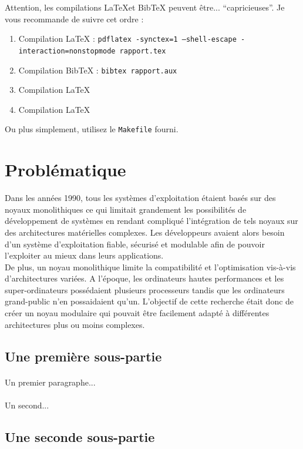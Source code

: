 \documentclass[a4paper, 12pt]{article}
\begin{document}
Attention, les compilations \LaTeX et BibTeX peuvent être... ``capricieuses''. Je vous recommande de suivre cet ordre :
\begin{enumerate}
\item Compilation \LaTeX{} : \texttt{pdflatex -synctex=1 --shell-escape -interaction=nonstopmode rapport.tex}
\item Compilation BibTeX : \texttt{bibtex rapport.aux}
\item Compilation \LaTeX{}
\item Compilation \LaTeX{}
\end{enumerate}
Ou plus simplement, utilisez le \texttt{Makefile} fourni.

\clearpage 
\section{Problématique}

Dans les années 1990, tous les systèmes d'exploitation étaient basés sur des noyaux monolithiques ce qui limitait grandement les possibilités de développement de systèmes en rendant compliqué l'intégration de tels noyaux sur des architectures matérielles complexes. Les développeurs avaient alors besoin d'un système d'exploitation fiable, sécurisé et modulable afin de pouvoir l'exploiter au mieux dans leurs applications. \\
De plus, un noyau monolithique limite la compatibilité et l'optimisation vis-à-vis d'architectures variées. A l'époque, les ordinateurs hautes performances et les super-ordinateurs possédaient plusieurs processeurs tandis que les ordinateurs grand-public n'en possaidaient qu'un. L'objectif de cette recherche était donc de créer un noyau modulaire qui pouvait être facilement adapté à différentes architectures plus ou moins complexes.

\subsection{Une première sous-partie}
\paragraph{}
Un premier paragraphe...
\paragraph{}
Un second...

\subsection{Une seconde sous-partie}
\end{document}

